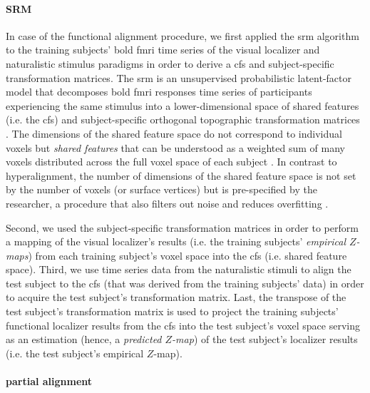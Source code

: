 \paragraph{SRM}

%
In case of the functional alignment procedure, we first applied the \ac{srm}
algorithm \citep{chen2015reduced, richard2019fast} to the training subjects'
\ac{bold} \ac{fmri} time series of the visual localizer and naturalistic
stimulus paradigms in order to derive a \ac{cfs} and subject-specific
transformation matrices.
%
The \ac{srm} is an unsupervised probabilistic latent-factor model that
decomposes \ac{bold} \ac{fmri} responses time series of participants
experiencing the same stimulus into a lower-dimensional space of shared features
(i.e. the \ac{cfs}) and subject-specific orthogonal topographic transformation
matrices \citep{kumar2020brainiak, cohen2017computational}.
%
The dimensions of the shared feature space do not correspond to individual
voxels but \textit{shared features} that can be understood as a weighted sum of
many voxels distributed across the full voxel space of each subject
\citep{kumar2020brainiak}.
%
In contrast to hyperalignment, the number of dimensions of the shared feature
space is not set by the number of voxels (or surface vertices) but is
pre-specified by the researcher, a procedure that also filters out noise and
reduces overfitting \citep{chen2015reduced}.

Second, we used the subject-specific transformation matrices in order to perform
a mapping of the visual localizer's results (i.e. the training subjects'
\textit{empirical $Z$-maps}) from each training subject's voxel space into the
\ac{cfs} (i.e. shared feature space).
Third, we use time series data from the naturalistic stimuli to align the test
subject to the \ac{cfs} (that was derived from the training subjects' data) in
order to acquire the test subject's transformation matrix.
Last, the transpose of the test subject's transformation matrix is used to
project the training subjects' functional localizer results from the \ac{cfs}
into the test subject's voxel space serving as an estimation (hence, a
\textit{predicted $Z$-map}) of the test subject's localizer results (i.e. the
test subject's empirical $Z$-map).


\paragraph{partial alignment}

